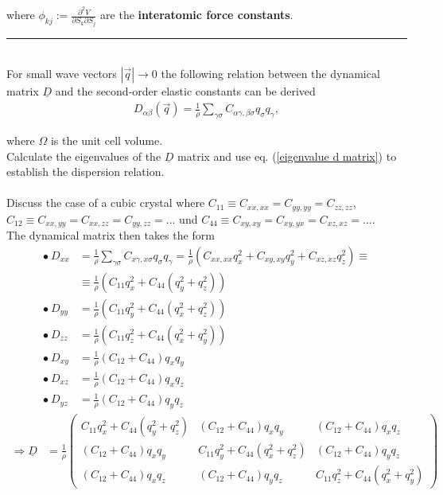 \documentclass{article}
\newcommand{\lr}[1]{\left(#1\right)}
\begin{document}
where $\phi_{kj} := \frac{\partial^2 V}{\partial S_k \partial S_j}$ are the \textbf{interatomic force constants}.

\vspace{0.5cm}

{\color{blue}
\hrule
	\\
	For small wave vectors $|\vec{q}|\to 0$ the following relation between the dynamical matrix $\underline{D}$ and the second-order elastic constants can be derived
		\begin{align*}
			D_{\alpha\beta}(\vec{q}) = \frac{1}{\rho} \sum_{\gamma\sigma} C_{\alpha\gamma,\beta\sigma} q_\sigma q_\gamma,
		\end{align*}

	where $\Omega$ is the unit cell volume.\\
	Calculate the eigenvalues of the $\underline{D}$ matrix and use eq. (\ref{eigenvalue d matrix}) to establish the dispersion relation.\\
	\\
	Discuss the case of a cubic crystal where $C_{11} \equiv C_{xx,xx} = C_{yy,yy} = C_{zz,zz}$, $C_{12} \equiv C_{xx,yy} = C_{xx,zz} = C_{yy,zz} = ...$ und $C_{44} \equiv C_{xy,xy} = C_{xy,yx} = C_{xz,xz} = ...$.\\
	The dynamical matrix then takes the form
		\begin{align*}
			\bullet \ D_{xx} &= \frac{1}{\rho} \sum_{\gamma\sigma} C_{x\gamma,x\sigma} q_\sigma q_\gamma = \frac{1}{\rho} \lr{ C_{xx,xx} q_x^2 + C_{xy,xy} q_y^2 + C_{xz,xz} q_z^2 } \equiv \\
			&\equiv \frac{1}{\rho} \lr{ C_{11} q_x^2 + C_{44}( q_y^2 + q_z^2 ) } \\
			\bullet \ D_{yy} &= \frac{1}{\rho} \lr{ C_{11} q_y^2 + C_{44}( q_x^2 + q_z^2 ) } \\
			\bullet \ D_{zz} &= \frac{1}{\rho} \lr{ C_{11} q_z^2 + C_{44}( q_x^2 + q_y^2 ) } \\
			\bullet \ D_{xy} &= \frac{1}{\rho} \lr{ C_{12} + C_{44} } q_x q_y \\
			\bullet \ D_{xz} &= \frac{1}{\rho} \lr{ C_{12} + C_{44} } q_x q_z \\
			\bullet \ D_{yz} &= \frac{1}{\rho} \lr{ C_{12} + C_{44} } q_y q_z
		\end{align*}
		\begin{align*}
			\Rightarrow \underline{D} &= \frac{1}{\rho}
			\begin{pmatrix}
				C_{11} q_x^2 + C_{44}( q_y^2 + q_z^2 ) & \lr{ C_{12} + C_{44} } q_x q_y & \lr{ C_{12} + C_{44} } q_x q_z \\
				\lr{ C_{12} + C_{44} } q_x q_y & C_{11} q_y^2 + C_{44}( q_x^2 + q_z^2 ) & \lr{ C_{12} + C_{44} } q_y q_z \\
				\lr{ C_{12} + C_{44} } q_x q_z & \lr{ C_{12} + C_{44} } q_y q_z & C_{11} q_z^2 + C_{44}( q_x^2 + q_y^2 )
			\end{pmatrix}
		\end{align*}

}
\end{document}
